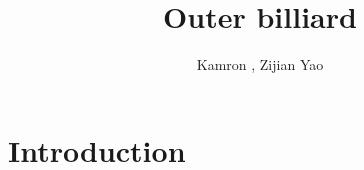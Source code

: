 \documentclass[12 pt]{amsart}
\title{Outer billiard}
\author{Kamron , Zijian Yao}
\begin{document}
\maketitle

















\section{Introduction}
\end{document}
